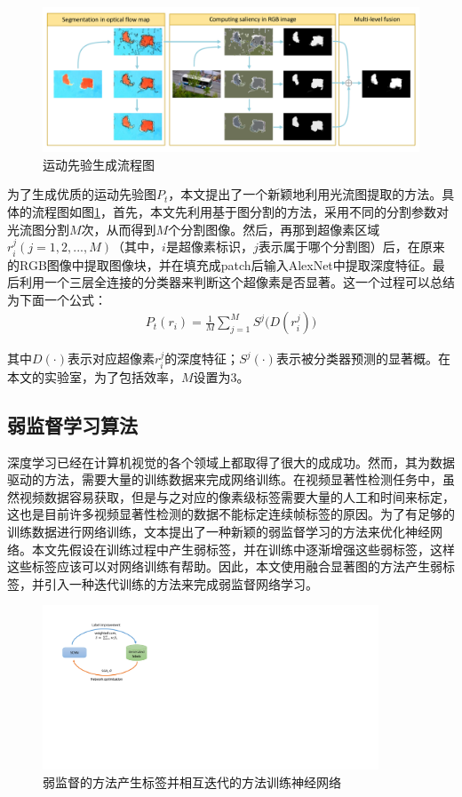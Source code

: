 \begin{figure}[tbp]
\center
\includegraphics[width=15cm]{figures/segment}
\caption{运动先验生成流程图}
\label{temporal_prior}
\end{figure}

为了生成优质的运动先验图$P_t$，本文提出了一个新颖地利用光流图提取的方法。具体的流程图如图\ref{temporal_prior}，首先，本文先利用基于图分割的方法，采用不同的分割参数对光流图分割$M$次，从而得到$M$个分割图像。然后，再那到超像素区域$r_i^j (j= 1, 2,..., M)$（其中，$i$是超像素标识，$j$表示属于哪个分割图）后，在原来的RGB图像中提取图像块，并在填充成patch后输入AlexNet中提取深度特征。最后利用一个三层全连接的分类器来判断这个超像素是否显著。这一个过程可以总结为下面一个公式：
\begin{equation}
 \label{eq3_2}
 \begin{aligned}
   P_t(r_i)  = \frac{1}{M} \sum_{j=1}^M S^j\big(D(r_i^j)\big)
 \end{aligned}
\end{equation}

其中$D(\cdot)$表示对应超像素$r_i^j$的深度特征；$S^j(\cdot)$表示被分类器预测的显著概。在本文的实验室，为了包括效率，$M$设置为3。
\subsection{弱监督学习算法}

深度学习已经在计算机视觉的各个领域上都取得了很大的成成功。然而，其为数据驱动的方法，需要大量的训练数据来完成网络训练。在视频显著性检测任务中，虽然视频数据容易获取，但是与之对应的像素级标签需要大量的人工和时间来标定，这也是目前许多视频显著性检测的数据不能标定连续帧标签的原因。为了有足够的训练数据进行网络训练，文本提出了一种新颖的弱监督学习的方法来优化神经网络。本文先假设在训练过程中产生弱标签，并在训练中逐渐增强这些弱标签，这样这些标签应该可以对网络训练有帮助。因此，本文使用融合显著图的方法产生弱标签，并引入一种迭代训练的方法来完成弱监督网络学习。

\begin{figure}[tbp]
 \centering
\includegraphics[width=10cm]{figures/labeling}
\caption{弱监督的方法产生标签并相互迭代的方法训练神经网络}
\label{weak_lables}
\end{figure}


